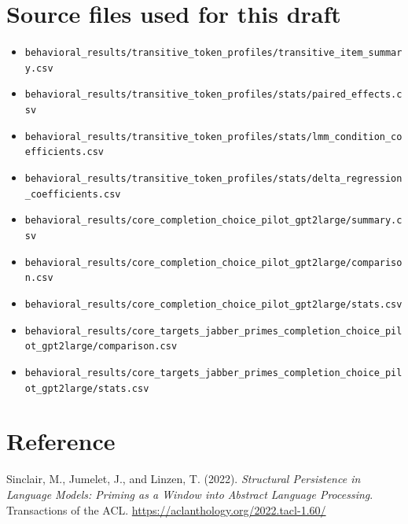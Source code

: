 \documentclass[11pt]{article}
\begin{document}
\section*{Source files used for this draft}

\begin{itemize}[leftmargin=*]
    \item \texttt{behavioral\_results/transitive\_token\_profiles/transitive\_item\_summary.csv}
    \item \texttt{behavioral\_results/transitive\_token\_profiles/stats/paired\_effects.csv}
    \item \texttt{behavioral\_results/transitive\_token\_profiles/stats/lmm\_condition\_coefficients.csv}
    \item \texttt{behavioral\_results/transitive\_token\_profiles/stats/delta\_regression\_coefficients.csv}
    \item \texttt{behavioral\_results/core\_completion\_choice\_pilot\_gpt2large/summary.csv}
    \item \texttt{behavioral\_results/core\_completion\_choice\_pilot\_gpt2large/comparison.csv}
    \item \texttt{behavioral\_results/core\_completion\_choice\_pilot\_gpt2large/stats.csv}
    \item \texttt{behavioral\_results/core\_targets\_jabber\_primes\_completion\_choice\_pilot\_gpt2large/comparison.csv}
    \item \texttt{behavioral\_results/core\_targets\_jabber\_primes\_completion\_choice\_pilot\_gpt2large/stats.csv}
\end{itemize}

\section*{Reference}

Sinclair, M., Jumelet, J., and Linzen, T. (2022).
\emph{Structural Persistence in Language Models:
Priming as a Window into Abstract Language Processing}.
Transactions of the ACL.
\url{https://aclanthology.org/2022.tacl-1.60/}
\end{document}

